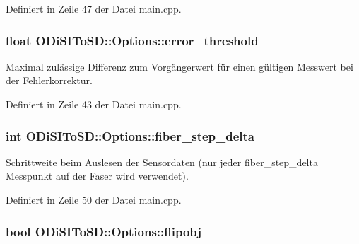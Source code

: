 Definiert in Zeile 47 der Datei main.\-cpp.

\hypertarget{structODiSIToSD_1_1Options_a3df2be923e13ab5f3727bd7975a5c37c}{
\subsubsection[{error\-\_\-threshold}]{\setlength{\rightskip}{0pt plus 5cm}float O\-Di\-S\-I\-To\-S\-D\-::\-Options\-::error\-\_\-threshold}}\label{structODiSIToSD_1_1Options_a3df2be923e13ab5f3727bd7975a5c37c}


Maximal zulässige Differenz zum Vorgängerwert für einen gültigen Messwert bei der Fehlerkorrektur. 



Definiert in Zeile 43 der Datei main.\-cpp.

\hypertarget{structODiSIToSD_1_1Options_a2759019ee4388dfaa5ec36f4530c7281}{
\subsubsection[{fiber\-\_\-step\-\_\-delta}]{\setlength{\rightskip}{0pt plus 5cm}int O\-Di\-S\-I\-To\-S\-D\-::\-Options\-::fiber\-\_\-step\-\_\-delta}}\label{structODiSIToSD_1_1Options_a2759019ee4388dfaa5ec36f4530c7281}


Schrittweite beim Auslesen der Sensordaten (nur jeder fiber\-\_\-step\-\_\-delta Messpunkt auf der Faser wird verwendet). 



Definiert in Zeile 50 der Datei main.\-cpp.

\hypertarget{structODiSIToSD_1_1Options_a014d92516c1c3abe5b482cdb648a1607}{
\subsubsection[{flipobj}]{\setlength{\rightskip}{0pt plus 5cm}bool O\-Di\-S\-I\-To\-S\-D\-::\-Options\-::flipobj}}\label{structODiSIToSD_1_1Options_a014d92516c1c3abe5b482cdb648a1607}


